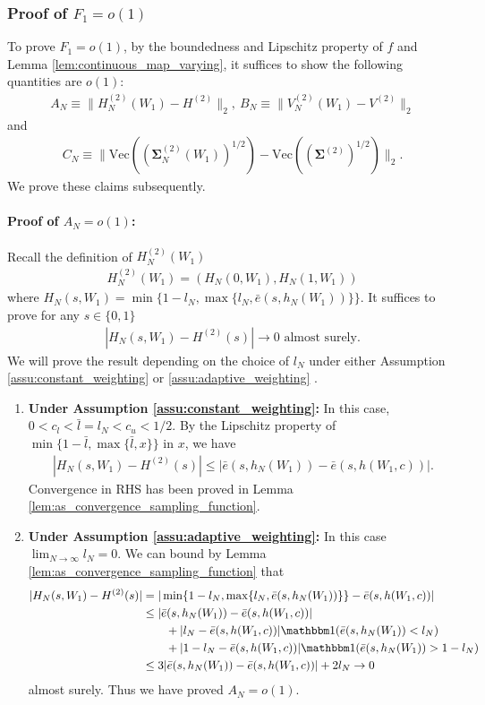 \documentclass[12pt]{article}
\newcommand{\indicator}{\mathbbm 1}						%
\begin{document}
\subsubsection{Proof of $F_1=o(1)$}


To prove $F_1=o(1)$, by the boundedness and Lipschitz property of $f$ and Lemma \ref{lem:continuous_map_varying}, it suffices to show the following quantities are $o(1)$:
\begin{align*}
	A_N\equiv \|H_N^{(2)}(W_1)-H^{(2)}\|_2,\ B_N\equiv \|V_N^{(2)}(W_1)-V^{(2)}\|_2
\end{align*}
and 
\begin{align*}
	C_N\equiv \|\mathrm{Vec}((\bm \Sigma_N^{(2)}(W_1))^{1/2})-\mathrm{Vec}((\bm \Sigma^{(2)})^{1/2})\|_{2}.
\end{align*}
We prove these claims subsequently.

   
\paragraph{Proof of $A_N=o(1)$:}
Recall the definition of $H_N^{(2)}(W_1)$
\begin{align*}
    H_N^{(2)}(W_1)=(H_N(0,W_1),H_N(1,W_1))
\end{align*}
where $H_N(s,W_1)=\min\{1-l_N,\max\{l_N,\bar e(s, h_N(W_1))\}\}$. It suffices to prove for any $s\in \{0,1\}$
\begin{align*}
	|H_N(s,W_1)-H^{(2)}(s)|\rightarrow 0\text{ almost surely}.
\end{align*}
We will prove the result depending on the choice of $l_N$ under either Assumption \ref{assu:constant_weighting} or \ref{assu:adaptive_weighting} .
\begin{enumerate}
	\item \textbf{Under Assumption \ref{assu:constant_weighting}:} In this case, $0<c_l<\bar l=l_N<c_u<1/2$. By the Lipschitz property of $\min\{1-\bar l,\max\{\bar l,x\}\}$ in $x$, we have
	\begin{align*}
		|H_N(s,W_1)-H^{(2)}(s)|\leq |\bar e(s,h_N(W_1))-\bar e(s,h(W_1,c))|.
	\end{align*}
	Convergence in RHS has been proved in Lemma \ref{lem:as_convergence_sampling_function}.
	
	\item \textbf{Under Assumption \ref{assu:adaptive_weighting}:} In this case $\lim_{N\rightarrow\infty}l_N=0$. We can bound by Lemma \ref{lem:as_convergence_sampling_function} that
	\begin{align*}
		|H_N(s,W_1)-H^{(2)}(s)|
		&
		=|\min\{1-l_N,\max\{l_N,\bar e(s,h_N(W_1))\}\}-\bar e(s,h(W_1,c))|\\
		&
		\leq |\bar e(s,h_N(W_1))-\bar e(s,h(W_1,c))|\\
		&
		\qquad+|l_N-\bar e(s,h(W_1,c))|\indicator(\bar e(s,h_N(W_1))<l_N)\\
		&
		\qquad + |1-l_N-\bar e(s,h(W_1,c))|\indicator(\bar e(s,h_N(W_1))>1-l_N)\\
		&
		\leq 3|\bar e(s,h_N(W_1))-\bar e(s,h(W_1,c))|+2l_N\rightarrow0
	\end{align*}
	almost surely. Thus we have proved $A_N=o(1)$.
\end{enumerate}
	
\end{document}
